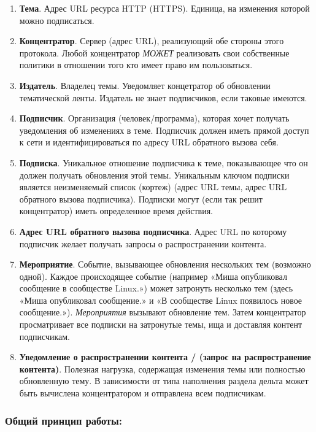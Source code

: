 \begin{enumerate}
\def\labelenumi{\arabic{enumi}.}
\tightlist
\item
  \textbf{Тема}. Адрес URL ресурса HTTP (HTTPS). Единица, на изменения
  которой можно подписаться.
\item
  \textbf{Концентратор}. Сервер (адрес URL), реализующий обе стороны
  этого протокола. Любой концентратор \emph{МОЖЕТ} реализовать свои
  собственные политики в отношении того кто имеет право им пользоваться.
\item
  \textbf{Издатель}. Владелец темы. Уведомляет концетратор об обновлении
  тематической ленты. Издатель не знает подписчиков, если таковые
  имеются.
\item
  \textbf{Подписчик}. Организация (человек/программа), которая хочет
  получать уведомления об изменениях в теме. Подписчик должен иметь
  прямой доступ к сети и идентифицироваться по адресу URL обратного
  вызова себя.
\item
  \textbf{Подписка}. Уникальное отношение подписчика к теме,
  показывающее что он должен получать обновления этой темы. Уникальным
  ключом подписки является неизменяемый список (кортеж) (адрес URL темы,
  адрес URL обратного вызова подписчика). Подписки могут (если так решит
  концентратор) иметь определенное время действия.
\item
  \textbf{Адрес URL обратного вызова подписчика}. Адрес URL по которому
  подписчик желает получать запросы о распространении контента.
\item
  \textbf{Мероприятие}. Событие, вызывающее обновления нескольких тем
  (возможно одной). Каждое происходящее событие (например «Миша
  опубликовал сообщение в сообществе Linux.») может затронуть несколько
  тем (здесь «Миша опубликовал сообщение.» и «В сообществе Linux
  появилось новое сообщение.»). \emph{Мероприятия} вызывают обновление
  тем. Затем концентратор просматривает все подписки на затронутые темы,
  ища и доставляя контент подписчикам.
\item
  \textbf{Уведомление о распространении контента / (запрос на
  распространение контента)}. Полезная нагрузка, содержащая изменения
  темы или полностью обновленную тему. В зависимости от типа наполнения
  раздела дельта может быть вычислена концентратором и отправлена всем
  подписчикам.
\end{enumerate}

\hypertarget{ux43eux431ux449ux438ux439-ux43fux440ux438ux43dux446ux438ux43f-ux440ux430ux431ux43eux442ux44b-1}{%
\subsubsection{Общий принцип
работы:}\label{ux43eux431ux449ux438ux439-ux43fux440ux438ux43dux446ux438ux43f-ux440ux430ux431ux43eux442ux44b-1}}

